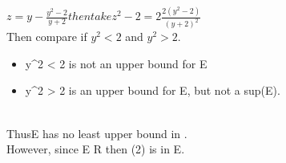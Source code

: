 $ z = y - \frac{y^2-2}{y+2} then take z^2-2 = 2 \frac{2(y^2-2)}{(y+2)^2} $ \\
Then compare if $y^2 < 2$ and $y^2 > 2$. \\
\begin{itemize}
	\item y^2 < 2 is not an upper bound for E
	\item y^2 > 2 is an upper bound for E, but not a sup(E).
\end{itemize} \\
ThusE has no least upper bound in . \\
However, since E \subsetof R then \sqrt(2) is in E.










